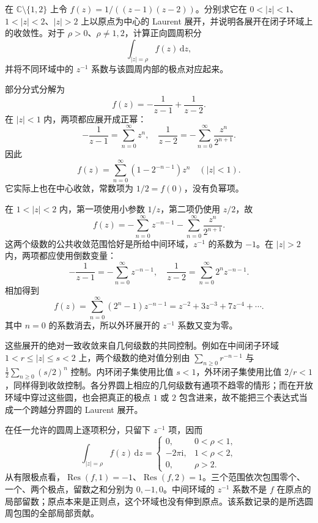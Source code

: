 \begin{exercise}\label{b3:ex:03-1}
在 \(\mathbb C\setminus\{1,2\}\) 上令 \(f(z)=1/((z-1)(z-2))\)。分别求它在
\(0<|z|<1\)、\(1<|z|<2\)、\(|z|>2\) 上以原点为中心的 Laurent 展开，并说明各展开在闭子环域上的收敛性。对于 \(\rho>0\)、\(\rho\ne1,2\)，计算正向圆周积分
\[
  \int_{|z|=\rho}f(z)\,\mathrm{d}z,
\]
并将不同环域中的 \(z^{-1}\) 系数与该圆周内部的极点对应起来。
\end{exercise}
\begin{solution}
部分分式分解为
\[
  f(z)=-\frac1{z-1}+\frac1{z-2}.
\]
在 \(|z|<1\) 内，两项都应展开成正幂：
\[
  -\frac1{z-1}=\sum_{n=0}^{\infty}z^n,
  \quad\frac1{z-2}=-\sum_{n=0}^{\infty}\frac{z^n}{2^{n+1}}.
\]
因此
\[
  f(z)=\sum_{n=0}^{\infty}(1-2^{-n-1})z^n
  \quad(|z|<1).
\]
它实际上也在中心收敛，常数项为 \(1/2=f(0)\)，没有负幂项。

在 \(1<|z|<2\) 内，第一项使用小参数 \(1/z\)，第二项仍使用 \(z/2\)，故
\[
  f(z)=-\sum_{n=0}^{\infty}z^{-n-1}
        -\sum_{n=0}^{\infty}\frac{z^n}{2^{n+1}}.
\]
这两个级数的公共收敛范围恰好是所给中间环域，\(z^{-1}\) 的系数为 \(-1\)。在 \(|z|>2\) 内，两项都应使用倒数变量：
\[
  -\frac1{z-1}=-\sum_{n=0}^{\infty}z^{-n-1},
  \quad\frac1{z-2}=\sum_{n=0}^{\infty}2^n z^{-n-1}.
\]
相加得到
\[
  f(z)=\sum_{n=0}^{\infty}(2^n-1)z^{-n-1}
       =z^{-2}+3z^{-3}+7z^{-4}+\cdots.
\]
其中 \(n=0\) 的系数消去，所以外环展开的 \(z^{-1}\) 系数又变为零。

这些展开的绝对一致收敛来自几何级数的共同控制。例如在中间闭子环域
\(1<r\le|z|\le s<2\) 上，两个级数的绝对值分别由
\(\sum_{n\ge0}r^{-n-1}\) 与 \(\frac12\sum_{n\ge0}(s/2)^n\) 控制。内环闭子集使用比值 \(s<1\)，外环闭子集使用比值 \(2/r<1\)，同样得到收敛控制。各分界圆上相应的几何级数有通项不趋零的情形；而在开放环域中穿过这些圆，也会把真正的极点 \(1\) 或 \(2\) 包含进来，故不能把三个表达式当成一个跨越分界圆的 Laurent 展开。

在任一允许的圆周上逐项积分，只留下 \(z^{-1}\) 项，因而
\[
  \int_{|z|=\rho}f(z)\,\mathrm{d}z
  =\begin{cases}
     0,&0<\rho<1,\\
     -2\pi\mathrm{i},&1<\rho<2,\\
     0,&\rho>2.
   \end{cases}
\]
从有限极点看，\(\operatorname{Res}(f,1)=-1\)、\(\operatorname{Res}(f,2)=1\)。三个范围依次包围零个、一个、两个极点，留数之和分别为 \(0,-1,0\)。中间环域的 \(z^{-1}\) 系数不是 \(f\) 在原点的局部留数；原点本来是正则点，这个环域也没有伸到原点。该系数记录的是所选圆周包围的全部局部贡献。
\end{solution}

